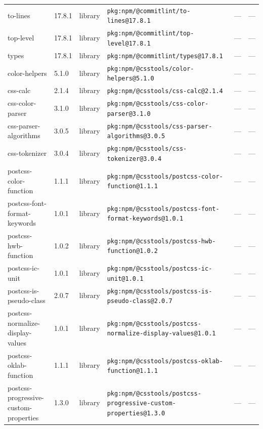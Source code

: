 \documentclass[11pt,a4paper]{article}
\begin{document}
\begin{longtable}{|p{4cm}|p{2cm}|p{1.6cm}|p{5cm}|p{1.5cm}|p{3.5cm}|}
\raggedright to-lines & 17.8.1 & library & \small\texttt{pkg:npm/@commitlint/to-lines@17.8.1} & — & \small — \\
\raggedright top-level & 17.8.1 & library & \small\texttt{pkg:npm/@commitlint/top-level@17.8.1} & — & \small — \\
\raggedright types & 17.8.1 & library & \small\texttt{pkg:npm/@commitlint/types@17.8.1} & — & \small — \\
\raggedright color-helpers & 5.1.0 & library & \small\texttt{pkg:npm/@csstools/color-helpers@5.1.0} & — & \small — \\
\raggedright css-calc & 2.1.4 & library & \small\texttt{pkg:npm/@csstools/css-calc@2.1.4} & — & \small — \\
\raggedright css-color-parser & 3.1.0 & library & \small\texttt{pkg:npm/@csstools/css-color-parser@3.1.0} & — & \small — \\
\raggedright css-parser-algorithms & 3.0.5 & library & \small\texttt{pkg:npm/@csstools/css-parser-algorithms@3.0.5} & — & \small — \\
\raggedright css-tokenizer & 3.0.4 & library & \small\texttt{pkg:npm/@csstools/css-tokenizer@3.0.4} & — & \small — \\
\raggedright postcss-color-function & 1.1.1 & library & \small\texttt{pkg:npm/@csstools/postcss-color-function@1.1.1} & — & \small — \\
\raggedright postcss-font-format-keywords & 1.0.1 & library & \small\texttt{pkg:npm/@csstools/postcss-font-format-keywords@1.0.1} & — & \small — \\
\raggedright postcss-hwb-function & 1.0.2 & library & \small\texttt{pkg:npm/@csstools/postcss-hwb-function@1.0.2} & — & \small — \\
\raggedright postcss-ic-unit & 1.0.1 & library & \small\texttt{pkg:npm/@csstools/postcss-ic-unit@1.0.1} & — & \small — \\
\raggedright postcss-is-pseudo-class & 2.0.7 & library & \small\texttt{pkg:npm/@csstools/postcss-is-pseudo-class@2.0.7} & — & \small — \\
\raggedright postcss-normalize-display-values & 1.0.1 & library & \small\texttt{pkg:npm/@csstools/postcss-normalize-display-values@1.0.1} & — & \small — \\
\raggedright postcss-oklab-function & 1.1.1 & library & \small\texttt{pkg:npm/@csstools/postcss-oklab-function@1.1.1} & — & \small — \\
\raggedright postcss-progressive-custom-properties & 1.3.0 & library & \small\texttt{pkg:npm/@csstools/postcss-progressive-custom-properties@1.3.0} & — & \small — \\

\end{longtable}
\end{document}
